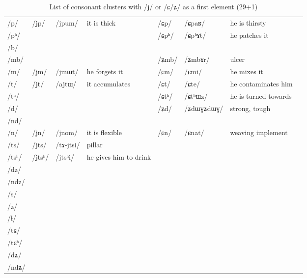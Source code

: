 \documentclass[oldfontcommands,oneside,a4paper,11pt]{article}
\newcommand{\ipa}[1]{\mbox{/#1/}} %
\newcommand{\deux}[1]{/#1/}
\newcommand{\idph}[1]{\cellcolor{gray}\textbf{#1}}
\begin{document}
\begin{landscape}
    \begin{longtable}{l|lll|lll|l}
 \caption{List of consonant clusters with \ipa{j} or \ipa{ɕ/ʑ}  as a first element (29+1)}\\%
\toprule
\ipa{p}  & 	 \deux{jp}  & 	 \ipa{jpum}  & 	 it is thick & 	 \deux{ɕp}  & 	 \ipa{ɕpaʁ}  & 	 he is thirsty  & 	\\
\ipa{pʰ}  & 	  & 	  & 	  & 	 \deux{ɕpʰ}  & 	 \ipa{ɕpʰɤt}  & 	 he patches it  & 	\\
\ipa{b}  & 	  & 	  & 	  & 	  & 	  & 	  & 	\\
\ipa{mb}  & 	  & 	  & 	  & 	 \deux{ʑmb}  & 	 \ipa{ʑmbɤr}  & 	 ulcer & 	\\
\ipa{m}  & 	 \deux{jm}  & 	 \ipa{jmɯt}  & 	he forgets it  & 	 \deux{ɕm}  & 	 \ipa{ɕmi}  & 	he mixes it & 	\\
\ipa{t}  & 	 \deux{jt}  & 	 \ipa{ajtɯ}  & 	it accumulates  & 	 \deux{ɕt}  & 	 \ipa{ɕte}  & 	he contaminates him & 	\\
\ipa{tʰ}  & 	  & 	  & 	  & 	 \deux{ɕtʰ}  & 	 \ipa{ɕtʰɯz}  & 	he is turned towards  & 	\\
\ipa{d}  & 	  & 	  & 	  & 	 \deux{ʑd} \idph{}  & 	 \ipa{ʑdɯɣʑdɯɣ}  & 	strong, tough  & 	\\
\ipa{nd}  & 	  & 	  & 	  & 	  & 	  & 	  & 	\\
\ipa{n}  & 	 \deux{jn}  & 	 \ipa{jnom}  & 	it is flexible  & 	 \deux{ɕn}  & 	 \ipa{ɕnat}  & 	weaving implement  & 	\\
\ipa{ts}  & 	 \deux{jts}  & 	 \ipa{tɤ-jtsi}  & 	pillar  & 	  & 	  & 	  & 	\\
\ipa{tsʰ}  & 	 \deux{jtsʰ}  & 	 \ipa{jtsʰi}  & 	 he gives him to drink & 	  & 	  & 	  & 	\\
\ipa{dz}  & 	  & 	  & 	  & 	  & 	  & 	  & 	\\
\ipa{ndz}  & 	  & 	  & 	  & 	  & 	  & 	  & 	\\
\ipa{s}  & 	  & 	  & 	  & 	  & 	  & 	  & 	\\
\ipa{z}  & 	  & 	  & 	  & 	  & 	  & 	  & 	\\
\ipa{ɬ}  & 	  & 	  & 	  & 	  & 	  & 	  & 	\\
\ipa{tɕ}  & 	  & 	  & 	  & 	  & 	  & 	  & 	\\
\ipa{tɕʰ}  & 	  & 	  & 	  & 	  & 	  & 	  & 	\\
\ipa{dʑ}  & 	  & 	  & 	  & 	  & 	  & 	  & 	\\
\ipa{ndʑ}  & 	  & 	  & 	  & 	  & 	  & 	  & 	\\

\end{longtable}
\end{landscape}
\end{document}
